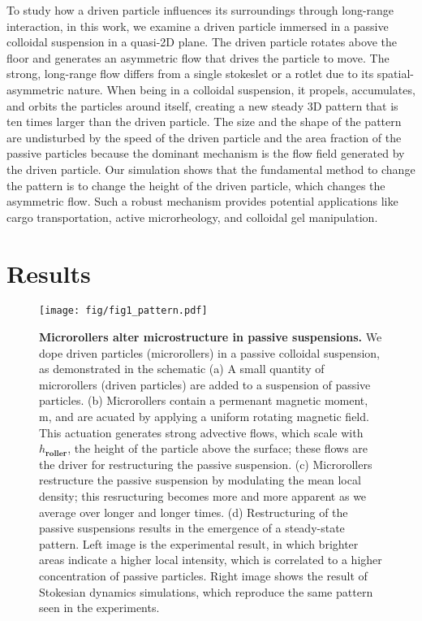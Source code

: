 \documentclass[12pt]{article}
\begin{document}
To study how a driven particle influences its surroundings through long-range interaction, in this work, we examine a driven particle immersed in a passive colloidal suspension in a quasi-2D plane. The driven particle rotates above the floor and generates an asymmetric flow that drives the particle to move. The strong, long-range flow differs from a single stokeslet or a rotlet due to its spatial-asymmetric nature.\cite{delmotte_hydrodynamic_2017} When being in a colloidal suspension, it propels, accumulates, and orbits the particles around itself, creating a new steady 3D pattern that is ten times larger than the driven particle. The size and the shape of the pattern are undisturbed by the speed of the driven particle and the area fraction of the passive particles because the dominant mechanism is the flow field generated by the driven particle. Our simulation shows that the fundamental method to change the pattern is to change the height of the driven particle, which changes the asymmetric flow. Such a robust mechanism provides potential applications like cargo transportation,\cite{petit_selective_2012, zhang_targeted_2012} active microrheology,\cite{zia_active_2018} and colloidal gel manipulation.\cite{massana-cid_active_2018, omar_swimming_2019, mallory_universal_2020} 
\fi

\section*{Results}

\begin{figure*}%
\centering
\texttt{[image: fig/fig1\_pattern.pdf]}
\caption{
\textbf{Microrollers alter microstructure in passive suspensions.} We dope driven particles (microrollers) in a passive colloidal suspension, as demonstrated in the schematic (a) A small quantity of microrollers (driven particles) are added to a suspension of passive particles. (b) Microrollers contain a permenant magnetic moment, m, and are acuated by applying a uniform rotating magnetic field.  This actuation generates strong advective flows, which scale with $h_{\mathbf{roller}}$, the height of the particle above the surface; these flows are the driver for restructuring the passive suspension. (c) Microrollers restructure the passive suspension by modulating the mean local  density; this resructuring becomes more and more apparent as we average over longer and longer times. (d) Restructuring of the passive suspensions results in the emergence of a steady-state pattern. Left image is the experimental result, in which brighter areas indicate a higher local intensity, which is correlated to a higher concentration of passive particles.  Right image shows the result of Stokesian dynamics simulations, which reproduce the same pattern seen in the experiments.
}
\label{fig:roller}
\end{figure*}
\end{document}
